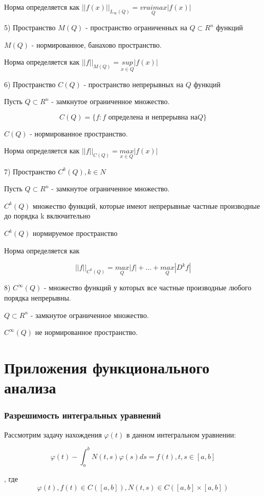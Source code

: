 \documentclass[12pt]{article}
\begin{document}
   Норма определяется как $||f(x)||_{L_{\infty}(Q)} =\underset{Q} {vraimax} |f(x)|$

5) Пространство $M(Q)$ - пространство ограниченных на $Q \subset R^n$ функций
	
	$M(Q)$ - нормированное, банахово пространство.
	
	Норма определяется как $||f||_{M(Q)} = \underset{x \in Q} {sup}|f(x)| $


6) Пространство $C(Q)$ - пространство непрерывных на $Q$ функций
	
	Пусть $Q \subset R^n$ - замкнутое ограниченное множество.	

	$$C(Q) = \{ f : f \text{ определена и непрерывна } на Q\}$$

	$C(Q)$ - нормированное пространство. 
	
	Норма определяется как $||f||_{C(Q)} = \underset{x \in Q} {max}|f(x)|$

7) Пространство $C^k(Q), k \in N$

	Пусть $Q \subset R^n$ - замкнутое ограниченное множество.	
	
	$C^k(Q)$ множество функций, которые имеют непрерывные частные производные до порядка k включительно
	
	$C^k(Q)$ нормируемое пространство
	
	Норма определяется как 
	
	$$||f||_{C^k(Q)} = \underset{Q}{max}|f| + ... + \underset{Q} {max} |D^k f|$$
	
8) $C^{\infty}(Q)$ - множество функций у которых все частные производные любого порядка непрерывны.

	$Q \subset R^n$ - замкнутое ограниченное множество.	
	
	$C^{\infty}(Q)$ не нормированное пространство.


\part{Приложения функционального анализа}

\section{Разрешимость интегральных уравнений}

Рассмотрим задачу нахождения $\varphi(t)$ в данном интегральном уравнении:

$$\varphi(t) - \int_a^b N(t,s)\varphi(s)ds = f(t), t,s \in [a,b]  $$

, где $$\varphi(t), f(t) \in C([a,b]), N(t,s)  \in C([a,b] \times  [a,b])$$	
	
\end{document}
